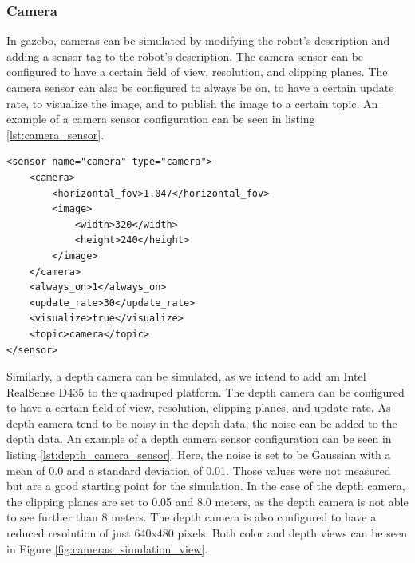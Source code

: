 \documentclass[12pt]{article}
\begin{document}
        \subsubsection{Camera}

        In gazebo, cameras can be simulated by modifying the robot's description and adding a sensor tag to the robot's description. The camera sensor can be configured to have a certain field of view, resolution, and clipping planes. The camera sensor can also be configured to always be on, to have a certain update rate, to visualize the image, and to publish the image to a certain topic. An example of a camera sensor configuration can be seen in listing \ref{lst:camera_sensor}.

\vspace{10pt }
\begin{minipage}{0.9\textwidth}
\begin{lstlisting}[style=xmlStyle, caption={Camera Sensor Configuration}, label={lst:camera_sensor}]
<sensor name="camera" type="camera">
    <camera>
        <horizontal_fov>1.047</horizontal_fov>
        <image>
            <width>320</width>
            <height>240</height>
        </image>
    </camera>
    <always_on>1</always_on>
    <update_rate>30</update_rate>
    <visualize>true</visualize>
    <topic>camera</topic>
</sensor>
\end{lstlisting}
\end{minipage}



        Similarly, a depth camera can be simulated, as we intend to add am Intel RealSense D435 to the quadruped platform. The depth camera can be configured to have a certain field of view, resolution, clipping planes, and update rate. As depth camera tend to be noisy in the depth data, the noise can be added to the depth data. An example of a depth camera sensor configuration can be seen in listing \ref{lst:depth_camera_sensor}. Here, the noise is set to be Gaussian with a mean of 0.0 and a standard deviation of 0.01. Those values were not measured but are a good starting point for the simulation. In the case of the depth camera, the clipping planes are set to 0.05 and 8.0 meters, as the depth camera is not able to see further than 8 meters. The depth camera is also configured to have a reduced resolution of just 640x480 pixels. Both color and depth views can be seen in Figure \ref{fig:cameras_simulation_view}.
        
\end{document}
